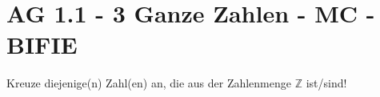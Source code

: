\section{AG 1.1 - 3 Ganze Zahlen - MC - BIFIE}

\begin{beispiel}[AG 1.1]{1} %
Kreuze diejenige(n) Zahl(en) an, die aus der Zahlenmenge $\mathbb{Z}$ ist/sind!
\end{beispiel}